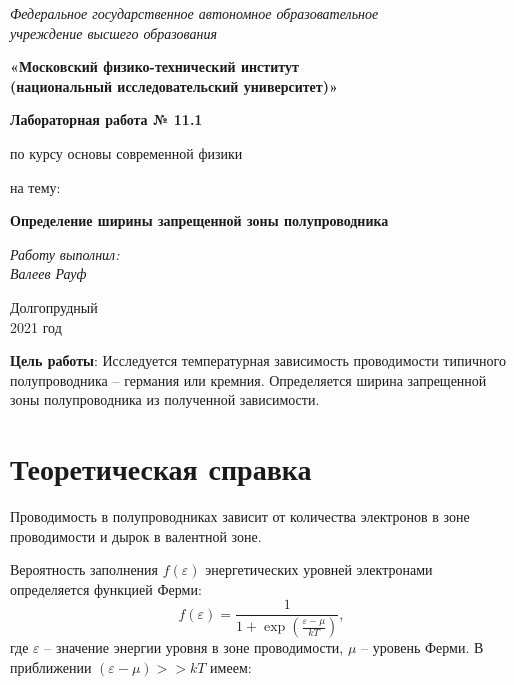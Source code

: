 \documentclass[a4paper, 12pt]{article}%
\begin{document}
		\begin{titlepage}
			\begin{center}
				\textit{Федеральное государственное автономное образовательное\\ учреждение высшего образования }
				\vspace{0.5ex}
				
				\textbf{«Московский физико-технический институт\\ (национальный исследовательский университет)»}
			\end{center}
			\vspace{10ex}
			\begin{center}
				\vspace{13ex}
				\textbf{Лабораторная работа № 11.1}
				\vspace{1ex}
				
				по курсу основы современной физики
				
				
				на тему:
				
				\textbf{\large{Определение ширины запрещенной зоны полупроводника}}
				
				\vspace{30ex}
				\begin{flushright}
					\noindent
					\textit{Работу выполнил:}
					\\
					\textit{Валеев Рауф
					}						 
				\end{flushright}
				\vfill
				Долгопрудный \\2021 год
			\end{center}
		\end{titlepage}
	
				\newpage	

	\pagestyle{fancy}
	
\textbf{Цель работы}: Исследуется температурная зависимость проводимости типичного полупроводника – германия или кремния. Определяется ширина запрещенной зоны полупроводника из полученной зависимости.

\section{Теоретическая справка}
Проводимость в полупроводниках зависит от количества электронов в зоне проводимости и дырок в валентной зоне.

Вероятность заполнения $f(\varepsilon)$ энергетических уровней электронами определяется функцией Ферми:
$$
f(\varepsilon) = \frac{1}{1+\exp\left(\frac{\varepsilon - \mu}{kT}\right)},
$$
где $\varepsilon$ -- значение энергии уровня в зоне проводимости, $\mu$ -- уровень Ферми. В приближении $(\varepsilon-\mu)>>kT$ имеем:
\end{document}
